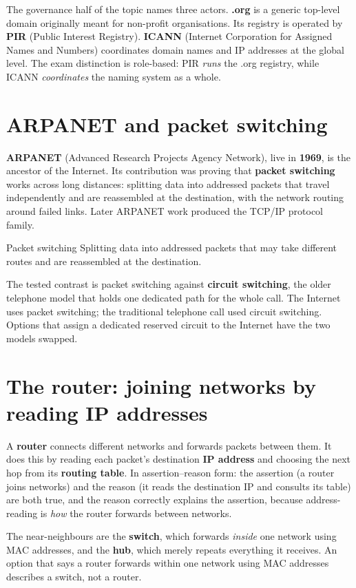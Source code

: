 The governance half of the topic names three actors. \textbf{.org} is a
generic top-level domain originally meant for non-profit organisations.
Its registry is operated by \textbf{PIR} (Public Interest Registry).
\textbf{ICANN} (Internet Corporation for Assigned Names and Numbers)
coordinates domain names and IP addresses at the global level. The exam
distinction is role-based: PIR \emph{runs} the .org registry, while ICANN
\emph{coordinates} the naming system as a whole.

\section{ARPANET and packet switching}
\textbf{ARPANET} (Advanced Research Projects Agency Network), live in
\textbf{1969}, is the ancestor of the Internet. Its contribution was proving
that \textbf{packet switching} works across long distances: splitting data
into addressed packets that travel independently and are reassembled at the
destination, with the network routing around failed links. Later ARPANET work
produced the TCP/IP protocol family.

\begin{definitionbox}{Packet switching}
Splitting data into addressed packets that may take different routes and are
reassembled at the destination.
\end{definitionbox}

The tested contrast is packet switching against \textbf{circuit switching},
the older telephone model that holds one dedicated path for the whole call.
The Internet uses packet switching; the traditional telephone call used
circuit switching. Options that assign a dedicated reserved circuit to the
Internet have the two models swapped.

\section{The router: joining networks by reading IP addresses}
A \textbf{router} connects different networks and forwards packets between
them. It does this by reading each packet's destination \textbf{IP address}
and choosing the next hop from its \textbf{routing table}. In
assertion--reason form: the assertion (a router joins networks) and the
reason (it reads the destination IP and consults its table) are both true,
and the reason correctly explains the assertion, because address-reading is
\emph{how} the router forwards between networks.

The near-neighbours are the \textbf{switch}, which forwards \emph{inside} one
network using MAC addresses, and the \textbf{hub}, which merely repeats
everything it receives. An option that says a router forwards within one
network using MAC addresses describes a switch, not a router.


